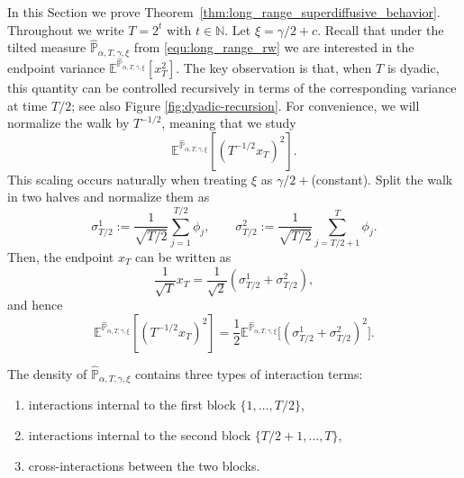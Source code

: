 \documentclass[reqno,11pt]{amsart}
\newcommand{\1}{\mathds{1}}
\theoremstyle{plain}
\theoremstyle{definition}
\numberwithin{equation}{section}
\newcommand{\bbE}{{\mathbb E}}
\newcommand{\bbP}{{\mathbb P}}
\newcommand{\bbPh}{\hat{\bbP}}
\def\lt{\left}
\def\rt{\right}
\begin{document}
In this Section we prove Theorem~\ref{thm:long_range_superdiffusive_behavior}.  
Throughout we write \(T = 2^t\) with \(t \in \mathbb N\). Let $\xi = \gamma/2 +c$.
Recall that under the tilted measure \(\hat{\bbP}_{\alpha,T,\gamma,\xi}\) from
\eqref{equ:long_range_rw} we are interested in the endpoint variance
\(\bbE^{\hat{\bbP}_{\alpha,T,\gamma,\xi}}[x_T^2]\).
The key observation is that, when \(T\) is dyadic, this quantity can be
controlled recursively in terms of the corresponding variance at time \(T/2\); see also Figure \ref{fig:dyadic-recursion}. For convenience, we will normalize the walk by $T^{-1/2}$, meaning that we study
$$\bbE^{\bbPh_{\alpha,T,\gamma,\xi}}\lt[ \lt( T^{-1/2} x_T  \rt)^2 \rt].$$
This scaling occurs naturally when treating $\xi$ as $\gamma/2 +$(constant).
Split the walk in two halves and normalize them as
\[
    \sigma^1 _{T/2} := \frac{1}{\sqrt{T/2}} \sum_{j=1}^{T/2} \phi_j,
    \qquad
    \sigma^2 _{T/2} := \frac{1}{\sqrt{T/2}} \sum_{j=T/2+1}^{T} \phi_j.
\]
Then, the endpoint \(x_T\) can be written as
\[
    \frac{1}{\sqrt{T}} x_T = \frac{1}{\sqrt{2}} (\sigma^1 _{T/2} + \sigma^2 _{T/2}),
\]
and hence
\[
    \bbE^{\hat{\bbP}_{\alpha,T,\gamma,\xi}}\lt[ \lt( T^{-1/2} x_T  \rt)^2 \rt]
    = \frac 1 2
    \bbE^{\hat{\bbP}_{\alpha,T,\gamma,\xi}}\bigl[(\sigma^1 _{T/2} + \sigma^2 _{T/2})^2\bigr].
\]

The density of \(\hat{\bbP}_{\alpha,T,\gamma,\xi}\) contains three types of
interaction terms:

\begin{enumerate}
    \item interactions internal to the first block \(\{1,\dots,T/2\}\),
    \item interactions internal to the second block \(\{T/2+1,\dots,T\}\),
    \item cross-interactions between the two blocks.
\end{enumerate}
\end{document}

